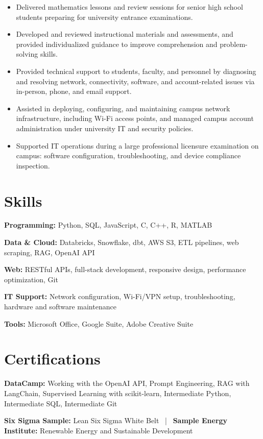\documentclass[10pt,a4paper]{article}
\begin{document}
\begin{itemize}
    \item Delivered mathematics lessons and review sessions for senior high school students preparing for university entrance examinations.
    \item Developed and reviewed instructional materials and assessments, and provided individualized guidance to improve comprehension and problem-solving skills.
\end{itemize}

\begin{itemize}
    \item Provided technical support to students, faculty, and personnel by diagnosing and resolving network, connectivity, software, and account-related issues via in-person, phone, and email support.
    \item Assisted in deploying, configuring, and maintaining campus network infrastructure, including Wi-Fi access points, and managed campus account administration under university IT and security policies.
    \item Supported IT operations during a large professional licensure examination on campus: software configuration, troubleshooting, and device compliance inspection.
\end{itemize}

\section*{Skills}
\textbf{Programming:} Python, SQL, JavaScript, C, C++, R, MATLAB\par
\textbf{Data \& Cloud:} Databricks, Snowflake, dbt, AWS S3, ETL pipelines, web scraping, RAG, OpenAI API\par
\textbf{Web:} RESTful APIs, full-stack development, responsive design, performance optimization, Git\par
\textbf{IT Support:} Network configuration, Wi-Fi/VPN setup, troubleshooting, hardware and software maintenance\par
\textbf{Tools:} Microsoft Office, Google Suite, Adobe Creative Suite

\section*{Certifications}
\textbf{DataCamp:} Working with the OpenAI API, Prompt Engineering, RAG with LangChain, Supervised Learning with scikit-learn, Intermediate Python, Intermediate SQL, Intermediate Git\par
\textbf{Six Sigma Sample:} Lean Six Sigma White Belt \, | \, \textbf{Sample Energy Institute:} Renewable Energy and Sustainable Development
\end{document}
